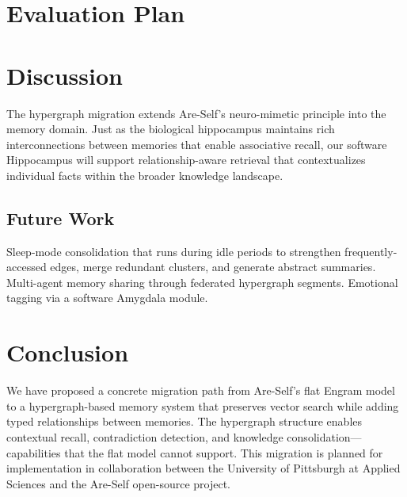 \documentclass[man,12pt,floatsintext]{apa7}
\begin{document}
\section{Evaluation Plan}


\section{Discussion}

The hypergraph migration extends Are-Self's neuro-mimetic principle into the memory domain.
Just as the biological hippocampus maintains rich interconnections between memories that
enable associative recall, our software Hippocampus will support relationship-aware
retrieval that contextualizes individual facts within the broader knowledge landscape.

\subsection{Future Work}

Sleep-mode consolidation that runs during idle periods to strengthen frequently-accessed
edges, merge redundant clusters, and generate abstract summaries. Multi-agent memory
sharing through federated hypergraph segments. Emotional tagging via a software
Amygdala module.

\section{Conclusion}

We have proposed a concrete migration path from Are-Self's flat Engram model to a
hypergraph-based memory system that preserves vector search while adding typed
relationships between memories. The hypergraph structure enables contextual recall,
contradiction detection, and knowledge consolidation---capabilities that the flat model
cannot support. This migration is planned for implementation in collaboration between the
University of Pittsburgh at Applied Sciences and the Are-Self open-source project.

\printbibliography
\end{document}
